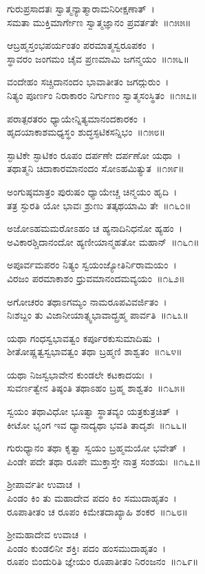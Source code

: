 ಗುರುಪ್ರಸಾದತಃ ಸ್ವಾತ್ಮನ್ಯಾತ್ಮಾರಾಮನಿರೀಕ್ಷಣಾತ್~।\\
ಸಮತಾ ಮುಕ್ತಿಮಾರ್ಗೇಣ ಸ್ವಾತ್ಮಜ್ಞಾನಂ ಪ್ರವರ್ತತೇ~॥೧೫೫॥

ಆಬ್ರಹ್ಮಸ್ತಂಭಪರ್ಯಂತಂ ಪರಮಾತ್ಮಸ್ವರೂಪಕಂ~।\\
ಸ್ಥಾವರಂ ಜಂಗಮಂ ಚೈವ ಪ್ರಣಮಾಮಿ ಜಗನ್ಮಯಂ~॥೧೫೬॥

ವಂದೇಹಂ ಸಚ್ಚಿದಾನಂದಂ ಭಾವಾತೀತಂ ಜಗದ್ಗುರುಂ~।\\
ನಿತ್ಯಂ ಪೂರ್ಣಂ ನಿರಾಕಾರಂ ನಿರ್ಗುಣಂ ಸ್ವಾತ್ಮಸಂಸ್ಥಿತಂ~॥೧೫೭॥

ಪರಾತ್ಪರತರಂ ಧ್ಯಾಯೇನ್ನಿತ್ಯಮಾನಂದಕಾರಕಂ~।\\
ಹೃದಯಾಕಾಶಮಧ್ಯಸ್ಥಂ ಶುದ್ಧಸ್ಫಟಿಕಸನ್ನಿಭಂ~॥೧೫೮॥

ಸ್ಫಾಟಿಕೇ ಸ್ಫಾಟಿಕಂ ರೂಪಂ ದರ್ಪಣೇ ದರ್ಪಣೋ ಯಥಾ~।\\
ತಥಾತ್ಮನಿ ಚಿದಾಕಾರಮಾನಂದಂ ಸೋಽಹಮಿತ್ಯುತ~॥೧೫೯॥

ಅಂಗುಷ್ಠಮಾತ್ರಂ ಪುರುಷಂ ಧ್ಯಾಯೇಚ್ಚ ಚಿನ್ಮಯಂ ಹೃದಿ~।\\
ತತ್ರ ಸ್ಫುರತಿ ಯೋ ಭಾವಃ ಶ್ರುಣು ತತ್ಕಥಯಾಮಿ ತೇ~॥೧೬೦॥

ಅಜೋಽಹಮಮರೋಽಹಂ ಚ ಹ್ಯನಾದಿನಿಧನೋ ಹ್ಯಹಂ~।\\
ಅವಿಕಾರಶ್ಚಿದಾನಂದೋ ಹ್ಯಣೀಯಾನ್ಮಹತೋ ಮಹಾನ್~॥೧೬೧॥

ಅಪೂರ್ವಮಪರಂ ನಿತ್ಯಂ ಸ್ವಯಂಜ್ಯೋತಿರ್ನಿರಾಮಯಂ~।\\
ವಿರಜಂ ಪರಮಾಕಾಶಂ ಧ್ರುವಮಾನಂದಮವ್ಯಯಂ~॥೧೬೨॥

ಅಗೋಚರಂ ತಥಾಽಗಮ್ಯಂ ನಾಮರೂಪವಿವರ್ಜಿತಂ~।\\
ನಿಃಶಬ್ದಂ ತು ವಿಜಾನೀಯಾತ್ಸ್ವಭಾವಾದ್ಬ್ರಹ್ಮ ಪಾರ್ವತಿ~॥೧೬೩॥

ಯಥಾ ಗಂಧಸ್ವಭಾವತ್ವಂ ಕರ್ಪೂರಕುಸುಮಾದಿಷು~।\\
ಶೀತೋಷ್ಣತ್ವಸ್ವಭಾವತ್ವಂ ತಥಾ ಬ್ರಹ್ಮಣಿ ಶಾಶ್ವತಂ~॥೧೬೪॥

ಯಥಾ ನಿಜಸ್ವಭಾವೇನ ಕುಂಡಲೇ ಕಟಕಾದಯಃ~।\\
ಸುವರ್ಣತ್ವೇನ ತಿಷ್ಠಂತಿ ತಥಾಽಹಂ ಬ್ರಹ್ಮ ಶಾಶ್ವತಂ~॥೧೬೫॥

ಸ್ವಯಂ ತಥಾವಿಧೋ ಭೂತ್ವಾ ಸ್ಥಾತವ್ಯಂ ಯತ್ರಕುತ್ರಚಿತ್~।\\
ಕೀಟೋ ಭೃಂಗ ಇವ ಧ್ಯಾನಾದ್ಯಥಾ ಭವತಿ ತಾದೃಶಃ~॥೧೬೬॥

ಗುರುಧ್ಯಾನಂ ತಥಾ ಕೃತ್ವಾ ಸ್ವಯಂ ಬ್ರಹ್ಮಮಯೋ ಭವೇತ್~।\\
ಪಿಂಡೇ ಪದೇ ತಥಾ ರೂಪೇ ಮುಕ್ತಾಸ್ತೇ ನಾತ್ರ ಸಂಶಯಃ~॥೧೬೭॥

ಶ್ರೀಪಾರ್ವತೀ ಉವಾಚ~।\\
ಪಿಂಡಂ ಕಿಂ ತು ಮಹಾದೇವ ಪದಂ ಕಿಂ ಸಮುದಾಹೃತಂ~।\\
ರೂಪಾತೀತಂ ಚ ರೂಪಂ ಕಿಮೇತದಾಖ್ಯಾಹಿ ಶಂಕರ~॥೧೬೮॥

ಶ್ರೀಮಹಾದೇವ ಉವಾಚ~।\\
ಪಿಂಡಂ ಕುಂಡಲಿನೀ ಶಕ್ತಿಃ ಪದಂ ಹಂಸಮುದಾಹೃತಂ~।\\
ರೂಪಂ ಬಿಂದುರಿತಿ ಜ್ಞೇಯಂ ರೂಪಾತೀತಂ ನಿರಂಜನಂ~॥೧೬೯॥

